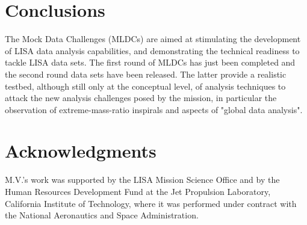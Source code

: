 \documentclass[12pt]{iopart}
\begin{document}
\section{Conclusions}

The Mock Data Challenges (MLDCs) are aimed at stimulating the development of LISA data analysis capabilities, and demonstrating the technical readiness to tackle LISA data sets. The first round of MLDCs has just been completed and the second round data sets have been released. The latter provide a realistic testbed, although still only at the conceptual level, of analysis techniques to attack the new analysis challenges posed by the mission, in particular the observation of extreme-mass-ratio inspirals and aspects of "global data analysis". 


\section*{Acknowledgments}
M.V.'s work was supported by the LISA Mission Science Office and by the Human Resources Development Fund at the Jet Propulsion Laboratory, California Institute of Technology, where it was performed under contract with the National Aeronautics and Space Administration.
\end{document}
